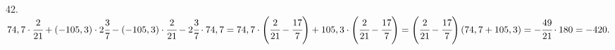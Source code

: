 42. $74,7\cdot\cfrac{2}{21}+(-105,3)\cdot2\cfrac{3}{7}-(-105,3)\cdot\cfrac{2}{21}-2\cfrac{3}{7}\cdot74,7=74,7\cdot\left(\cfrac{2}{21}-\cfrac{17}{7}\right)+105,3
\cdot\left(\cfrac{2}{21}-\cfrac{17}{7}\right)=\left(\cfrac{2}{21}-\cfrac{17}{7}\right)(74,7+105,3)=-\cfrac{49}{21}\cdot180=-420.$\\
